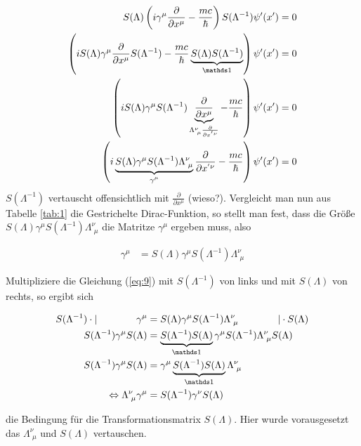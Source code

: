 \begin{align}
  \label{eq:8}
  S(\Lambda)  \left(i\gamma^\mu\frac{\partial}{\partial x^\mu}-\frac{mc}{\hbar}\right)S(\Lambda^{-1}) \psi'(x') &= 0 \notag \\
\left(iS(\Lambda) \gamma^\mu  \frac{\partial}{\partial x^\mu}S(\Lambda^{-1}) - \frac{mc}{\hbar}\underbr{S(\Lambda)S(\Lambda^{-1})}_{\mathds 1}\right)\psi'(x') &= 0 \notag \\
\left(iS(\Lambda) \gamma^\mu S(\Lambda^{-1}) \underbrace{\frac{\partial}{\partial x^\mu}}_{\Lambda^\nu_{\,\,\mu}\frac{\partial}{\partial x^{'\nu}}} - \frac{mc}{\hbar}\right)\psi'(x') &= 0 \notag \\
\left(i\underbr{S(\Lambda) \gamma^\mu S(\Lambda^{-1}) \Lambda^\nu_{\,\,\mu}}_{\gamma^\mu}\frac{\partial}{\partial x^{'\nu}} - \frac{mc}{\hbar}\right)\psi'(x') &= 0 \\
\end{align}
\(S(\Lambda^{-1})\) vertauscht offensichtlich mit \(\frac{\partial}{\partial x^\mu}\) (wieso?). Vergleicht man nun aus Tabelle \ref{tab:1} die Gestrichelte Dirac-Funktion, so stellt man fest, dass die Größe \( S(\Lambda) \gamma^\mu S(\Lambda^{-1}) \Lambda^\nu_{\,\,\mu}\) die Matritze \(\gamma^\mu\) ergeben muss, also

\begin{align}
  \label{eq:9}
  \gamma^\mu &= S(\Lambda) \gamma^\mu S(\Lambda^{-1}) \Lambda^\nu_{\,\,\mu} 
\end{align}

Multipliziere die Gleichung (\ref{eq:9}) mit \(S(\Lambda^{-1})\)  von links  und mit \(S(\Lambda)\) von rechts, so ergibt sich


\begin{align}
  \label{eq:10}
 S(\Lambda^{-1})\cdot|\qquad \qquad  \gamma^\mu &= S(\Lambda) \gamma^\mu S(\Lambda^{-1}) \Lambda^\nu_{\,\,\mu} \qquad \qquad |\cdot S(\Lambda) \notag \\
 S(\Lambda^{-1}) \gamma^\mu S(\Lambda) &=\underbr{S(\Lambda^{-1}) S(\Lambda)}_{\mathds 1} \gamma^\mu S(\Lambda^{-1}) \Lambda^\nu_{\,\,\mu} S(\Lambda) \notag \\
 S(\Lambda^{-1}) \gamma^\mu S(\Lambda) &= \gamma^\mu\underbr{ S(\Lambda^{-1})S(\Lambda)}_{\mathds 1} \Lambda^\nu_{\,\,\mu}  \notag \\
\Leftrightarrow   \Lambda^\nu_{\,\,\mu}\gamma^\mu &= S(\Lambda^{-1})\gamma^\nu S(\Lambda) 
\end{align}

die Bedingung für die Transformationsmatrix \(S(\Lambda)\). Hier wurde vorausgesetzt das \(\Lambda^\nu_{\,\,\mu}\) und \( S(\Lambda)\) vertauschen.  


